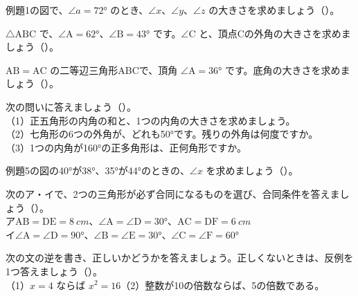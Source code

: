 \bkendproblems
{}

\bkproblem 例題1の図で、$\angle a=72°$ のとき、$\angle x$、$\angle y$、$\angle z$ の大きさを求めましょう（）。

\bkproblem $\triangle\mathrm{ABC}$ で、$\angle\mathrm{A}=62°$、$\angle\mathrm{B}=43°$ です。$\angle\mathrm{C}$ と、頂点Cの外角の大きさを求めましょう（）。

\bkproblem $\mathrm{AB}=\mathrm{AC}$ の二等辺三角形ABCで、頂角 $\angle\mathrm{A}=36°$ です。底角の大きさを求めましょう（）。

\bkproblem 次の問いに答えましょう（）。\\
（1）正五角形の内角の和と、1つの内角の大きさを求めましょう。\\
（2）七角形の6つの外角が、どれも50°です。残りの外角は何度ですか。\\
（3）1つの内角が160°の正多角形は、正何角形ですか。

\bkproblem 例題5の図の40°が38°、35°が44°のときの、$\angle x$ を求めましょう（）。

\bkproblem 次のア・イで、2つの三角形が必ず合同になるものを選び、合同条件を答えましょう（）。\\
ア\enspace $\mathrm{AB}=\mathrm{DE}=\qty{8}{cm}$、$\angle\mathrm{A}=\angle\mathrm{D}=30°$、$\mathrm{AC}=\mathrm{DF}=\qty{6}{cm}$\\
イ\enspace $\angle\mathrm{A}=\angle\mathrm{D}=90°$、$\angle\mathrm{B}=\angle\mathrm{E}=30°$、$\angle\mathrm{C}=\angle\mathrm{F}=60°$


\bkproblem 次の文の逆を書き、正しいかどうかを答えましょう。正しくないときは、反例を1つ答えましょう（）。\\
（1）$x=4$ ならば $x^2=16$\qquad（2）整数が10の倍数ならば、5の倍数である。

